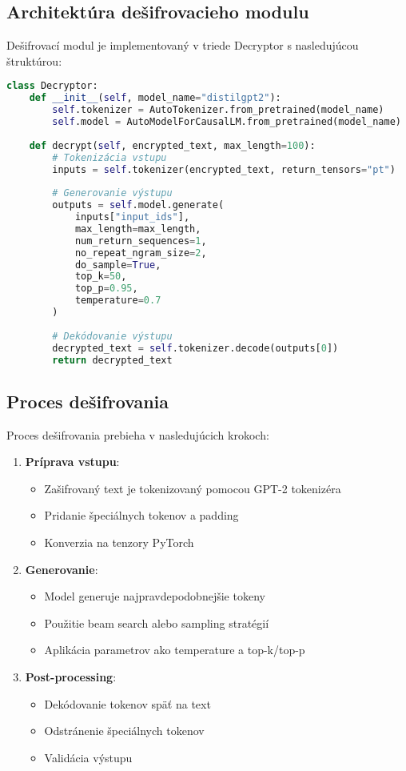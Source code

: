 \documentclass[12pt,a4paper]{article}
\begin{document}
\subsection{Architektúra dešifrovacieho modulu}
Dešifrovací modul je implementovaný v triede Decryptor s nasledujúcou štruktúrou:

\begin{lstlisting}[language=Python]
class Decryptor:
    def __init__(self, model_name="distilgpt2"):
        self.tokenizer = AutoTokenizer.from_pretrained(model_name)
        self.model = AutoModelForCausalLM.from_pretrained(model_name)
        
    def decrypt(self, encrypted_text, max_length=100):
        # Tokenizácia vstupu
        inputs = self.tokenizer(encrypted_text, return_tensors="pt")
        
        # Generovanie výstupu
        outputs = self.model.generate(
            inputs["input_ids"],
            max_length=max_length,
            num_return_sequences=1,
            no_repeat_ngram_size=2,
            do_sample=True,
            top_k=50,
            top_p=0.95,
            temperature=0.7
        )
        
        # Dekódovanie výstupu
        decrypted_text = self.tokenizer.decode(outputs[0])
        return decrypted_text
\end{lstlisting}

\subsection{Proces dešifrovania}
Proces dešifrovania prebieha v nasledujúcich krokoch:

\begin{enumerate}
    \item \textbf{Príprava vstupu}:
    \begin{itemize}
        \item Zašifrovaný text je tokenizovaný pomocou GPT-2 tokenizéra
        \item Pridanie špeciálnych tokenov a padding
        \item Konverzia na tenzory PyTorch
    \end{itemize}
    
    \item \textbf{Generovanie}:
    \begin{itemize}
        \item Model generuje najpravdepodobnejšie tokeny
        \item Použitie beam search alebo sampling stratégií
        \item Aplikácia parametrov ako temperature a top-k/top-p
    \end{itemize}
    
    \item \textbf{Post-processing}:
    \begin{itemize}
        \item Dekódovanie tokenov späť na text
        \item Odstránenie špeciálnych tokenov
        \item Validácia výstupu
    \end{itemize}
\end{enumerate}
\end{document}
